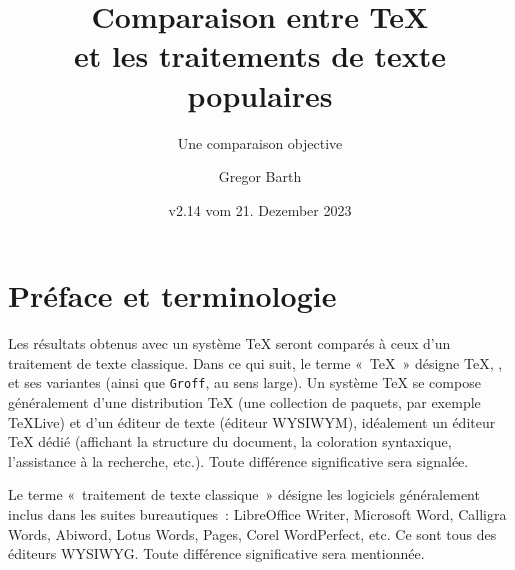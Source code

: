 \documentclass[11pt,a4paper,ngerman,french,DIV=8]{scrartcl}
\title{Comparaison entre \TeX{}\\et les traitements de texte populaires}
\subtitle{Une comparaison objective}
\author{Gregor Barth}
\date{v2.14 vom 21. Dezember 2023}
\begin{document}
\maketitle

\tableofcontents

\section{Préface et terminologie}

Les résultats obtenus avec un système \TeX{} seront comparés à ceux d'un traitement de texte classique. Dans ce qui suit, le terme « \TeX{} » désigne \TeX{}, \XeTeX{}, \LuaTeX{} et ses variantes (ainsi que \texttt{Groff}, au sens large). Un système \TeX{} se compose généralement d'une distribution \TeX{} (une collection de paquets, par exemple TeXLive) et d'un éditeur de texte (éditeur WYSIWYM), idéalement un éditeur \TeX{} dédié (affichant la structure du document, la coloration syntaxique, l'assistance à la recherche, etc.). Toute différence significative sera signalée.

Le terme « traitement de texte classique » désigne les logiciels généralement inclus dans les suites bureautiques : LibreOffice Writer, Microsoft Word, Calligra Words, Abiword, Lotus Words, Pages, Corel WordPerfect, etc. Ce sont tous des éditeurs WYSIWYG. Toute différence significative sera mentionnée.
\end{document}
